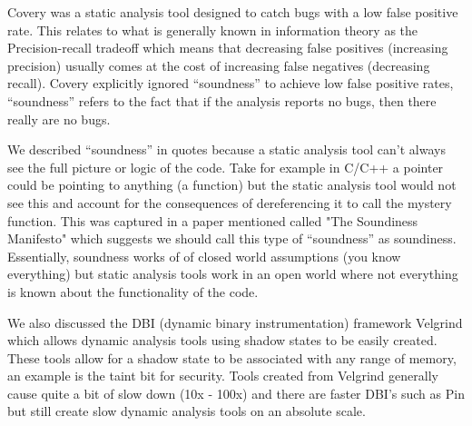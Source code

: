 \documentclass[twoside]{article}
\begin{document}
Covery was a static analysis tool designed to catch bugs with a low false positive rate. This relates to what is generally known in information theory as the Precision-recall tradeoff which means that decreasing false positives (increasing precision) usually comes at the cost of increasing false negatives (decreasing recall). Covery explicitly ignored ``soundness'' to achieve low false positive rates, ``soundness'' refers to the fact that if the analysis reports no bugs, then there really are no bugs.

We described ``soundness'' in quotes because a static analysis tool can't always see the full picture or logic of the code. Take for example in C/C++ a pointer could be pointing to anything (a function) but the static analysis tool would not see this and account for the consequences of dereferencing it to call the mystery function. This was captured in a paper mentioned called "The Soundiness Manifesto" which suggests we should call this type of ``soundness'' as soundiness. Essentially, soundness works of of closed world assumptions (you know everything) but static analysis tools work in an open world where not everything is known about the functionality of the code.

We also discussed the DBI (dynamic binary instrumentation) framework Velgrind which allows dynamic analysis tools using shadow states to be easily created. These tools allow for a shadow state to be associated with any range of memory, an example is the taint bit for security. Tools created from Velgrind generally cause quite a bit of slow down (10x - 100x) and there are faster DBI's such as Pin but still create slow dynamic analysis tools on an absolute scale.
\end{document}
